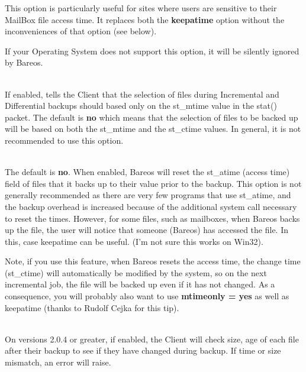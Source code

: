 \begin{description}
   This option is particularly useful for sites where users are sensitive
   to their MailBox file access time.  It replaces both the {\bf keepatime}
   option without the inconveniences of that option (see below).

   If your Operating System does not support this option, it will be
   silently ignored by Bareos.


\item [mtimeonly=yes{\textbar}no] \hfill \\
   If enabled, tells the Client that the selection of files during
   Incremental and Differential backups should based only on the st\_mtime
   value in the stat() packet.  The default is {\bf no} which means that
   the selection of files to be backed up will be based on both the
   st\_mtime and the st\_ctime values.  In general, it is not recommended
   to use this option.

\item [keepatime=yes{\textbar}no] \hfill \\
   The default is {\bf no}.  When enabled, Bareos will reset the st\_atime
   (access time) field of files that it backs up to their value prior to
   the backup.  This option is not generally recommended as there are very
   few programs that use st\_atime, and the backup overhead is increased
   because of the additional system call necessary to reset the times.
   However, for some files, such as mailboxes, when Bareos backs up the
   file, the user will notice that someone (Bareos) has accessed the
   file. In this, case keepatime can be useful.
   (I'm not sure this works on Win32).

   Note, if you use this feature, when Bareos resets the access time, the
   change time (st\_ctime) will automatically be modified by the system,
   so on the next incremental job, the file will be backed up even if
   it has not changed. As a consequence, you will probably also want
   to use {\bf mtimeonly = yes} as well as keepatime (thanks to
   Rudolf Cejka for this tip).

\item [checkfilechanges=yes{\textbar}no] \hfill \\
   On versions 2.0.4 or greater,
   if enabled, the Client will check size, age of each file after
   their backup to see if they have changed during backup. If time
   or size mismatch, an error will raise.


\end{description}
